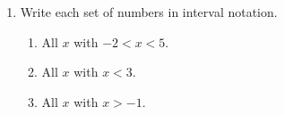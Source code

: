 \documentclass[10pt]{article}
\begin{document}
\begin{enumerate}[itemsep=12pt]
\item Write each set of numbers in interval notation.

\begin{enumerate}[label=(\alph*), itemsep=8pt]
  \item All $x$ with $-2 < x < 5$. \hfill \blank{3cm}
  \item All $x$ with $x < 3$. \hfill \blank{3cm}
  \item All $x$ with $x > -1$. \hfill \blank{3cm}
\end{enumerate}

\end{enumerate}
\end{document}
